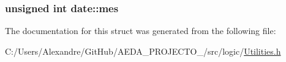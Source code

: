 \subsubsection[{mes}]{\setlength{\rightskip}{0pt plus 5cm}unsigned int date\+::mes}\label{structdate_a017e212612160fd138ba2ebdc6cda30d}


The documentation for this struct was generated from the following file\+:\begin{DoxyCompactItemize}
\item 
C\+:/\+Users/\+Alexandre/\+Git\+Hub/\+A\+E\+D\+A\+\_\+\+P\+R\+O\+J\+E\+C\+T\+O\+\_/src/logic/\hyperlink{_utilities_8h}{Utilities.\+h}\end{DoxyCompactItemize}
